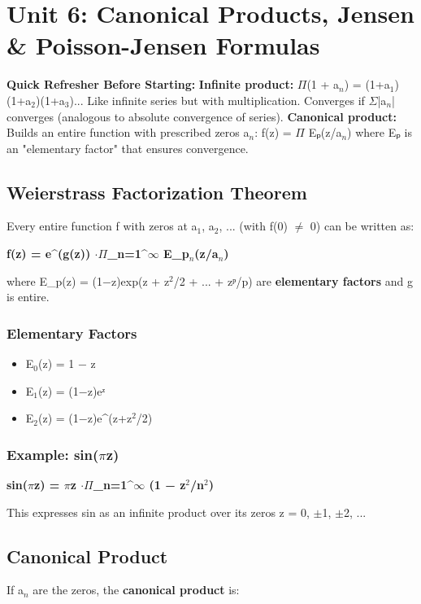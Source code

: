 \documentclass[12pt,a4paper,openany]{book}
\begin{document}
{{\section{Unit 6: Canonical Products, Jensen & Poisson-Jensen Formulas}

\begin{prereqbox}
 \textbf{Quick Refresher Before Starting:}
\textbf{Infinite product:} $\Pi$(1 + a$_n$) = (1+a$_1$)(1+a$_2$)(1+a$_3$)... Like infinite series but with multiplication.
Converges if $\Sigma$|a$_n$| converges (analogous to absolute convergence of series).
\textbf{Canonical product:} Builds an entire function with prescribed zeros {a$_n$}:
f(z) = $\Pi$ Eₚ(z/a$_n$) where Eₚ is an "elementary factor" that ensures convergence.
\end{prereqbox}


\subsection{Weierstrass Factorization Theorem }

Every entire function f with zeros at a$_1$, a$_2$, ... (with f(0) $\neq$ 0) can be written as:

\textbf{f(z) = e^(g(z)) $\cdot\Pi$_{n=1}^$\infty$ E_p$_n$(z/a$_n$)}

where E_p(z) = (1−z)exp(z + z$^2$/2 + ... + zᵖ/p) are \textbf{elementary factors} and g is entire.

\subsubsection{Elementary Factors}
\begin{itemize}[leftmargin=*]
  \item E$_0$(z) = 1 − z
  \item E$_1$(z) = (1−z)eᶻ
  \item E$_2$(z) = (1−z)e^(z+z$^2$/2)
\end{itemize}

\subsubsection{Example: sin($\pi$z)}
\textbf{sin($\pi$z) = $\pi$z $\cdot\Pi$_{n=1}^$\infty$ (1 − z$^2$/n$^2$)}

This expresses sin as an infinite product over its zeros z = 0, $\pm$1, $\pm$2, ...

\subsection{Canonical Product}
If {a$_n$} are the zeros, the \textbf{canonical product} is:

}}
\end{document}
